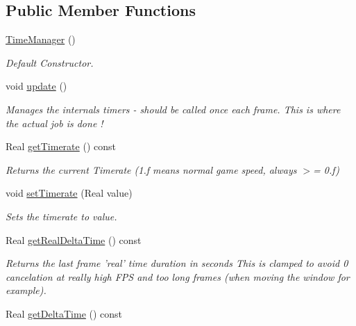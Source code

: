 \subsection*{Public Member Functions}
\begin{DoxyCompactItemize}
\item 
\hyperlink{class_time_manager_ab1c3cbb48ad68d928bb8b9a4ef210ed6}{Time\+Manager} ()
\begin{DoxyCompactList}\small\item\em Default Constructor. \end{DoxyCompactList}\item 
\hypertarget{class_time_manager_a97d902b19861efc099141eeb846671a3}{void \hyperlink{class_time_manager_a97d902b19861efc099141eeb846671a3}{update} ()}\label{class_time_manager_a97d902b19861efc099141eeb846671a3}

\begin{DoxyCompactList}\small\item\em Manages the internals timers -\/ should be called once each frame. This is where the actual job is done ! \end{DoxyCompactList}\item 
\hypertarget{class_time_manager_ae47f04150537e55eab595762e0bb0d18}{Real \hyperlink{class_time_manager_ae47f04150537e55eab595762e0bb0d18}{get\+Timerate} () const }\label{class_time_manager_ae47f04150537e55eab595762e0bb0d18}

\begin{DoxyCompactList}\small\item\em Returns the current Timerate (1.\+f means normal game speed, always $>$= 0.\+f) \end{DoxyCompactList}\item 
void \hyperlink{class_time_manager_a59b542c461ec5142fecd03b78e105fcd}{set\+Timerate} (Real value)
\begin{DoxyCompactList}\small\item\em Sets the timerate to value. \end{DoxyCompactList}\item 
\hypertarget{class_time_manager_aa65b353c86f1c628a904888fd5ff0cf2}{Real \hyperlink{class_time_manager_aa65b353c86f1c628a904888fd5ff0cf2}{get\+Real\+Delta\+Time} () const }\label{class_time_manager_aa65b353c86f1c628a904888fd5ff0cf2}

\begin{DoxyCompactList}\small\item\em Returns the last frame 'real' time duration in seconds This is clamped to avoid 0 cancelation at really high F\+P\+S and too long frames (when moving the window for example). \end{DoxyCompactList}\item 
\hypertarget{class_time_manager_ae9f23854e9a4bc1af43cb528acfbdf8e}{Real \hyperlink{class_time_manager_ae9f23854e9a4bc1af43cb528acfbdf8e}{get\+Delta\+Time} () const }\label{class_time_manager_ae9f23854e9a4bc1af43cb528acfbdf8e}


\end{DoxyCompactItemize}
